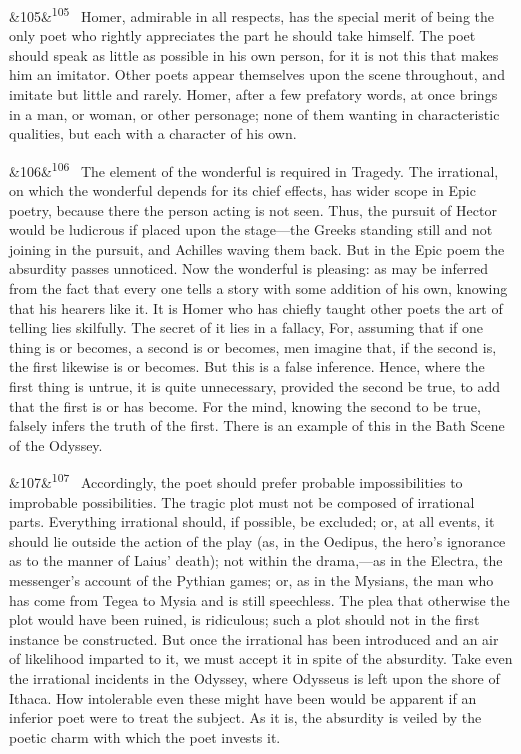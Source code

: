 \documentclass[12pt]{article}
\newcommand{\para}[1][]{\par\noindent\ifx&#1&\else\textsuperscript{\footnotesize #1}~\fi}
\begin{document}
{\para[105] Homer, admirable in all respects, has the special merit of being the only poet who rightly appreciates the part he should take himself. The poet should speak as little as possible in his own person, for it is not this that makes him an imitator. Other poets appear themselves upon the scene throughout, and imitate but little and rarely. Homer, after a few prefatory words, at once brings in a man, or woman, or other personage; none of them wanting in characteristic qualities, but each with a character of his own.

\para[106] The element of the wonderful is required in Tragedy. The irrational, on which the wonderful depends for its chief effects, has wider scope in Epic poetry, because there the person acting is not seen. Thus, the pursuit of Hector would be ludicrous if placed upon the stage---the Greeks standing still and not joining in the pursuit, and Achilles waving them back. But in the Epic poem the absurdity passes unnoticed. Now the wonderful is pleasing: as may be inferred from the fact that every one tells a story with some addition of his own, knowing that his hearers like it. It is Homer who has chiefly taught other poets the art of telling lies skilfully. The secret of it lies in a fallacy, For, assuming that if one thing is or becomes, a second is or becomes, men imagine that, if the second is, the first likewise is or becomes. But this is a false inference. Hence, where the first thing is untrue, it is quite unnecessary, provided the second be true, to add that the first is or has become. For the mind, knowing the second to be true, falsely infers the truth of the first. There is an example of this in the Bath Scene of the Odyssey.

\para[107] Accordingly, the poet should prefer probable impossibilities to improbable possibilities. The tragic plot must not be composed of irrational parts. Everything irrational should, if possible, be excluded; or, at all events, it should lie outside the action of the play (as, in the Oedipus, the hero's ignorance as to the manner of Laius' death); not within the drama,---as in the Electra, the messenger's account of the Pythian games; or, as in the Mysians, the man who has come from Tegea to Mysia and is still speechless. The plea that otherwise the plot would have been ruined, is ridiculous; such a plot should not in the first instance be constructed. But once the irrational has been introduced and an air of likelihood imparted to it, we must accept it in spite of the absurdity. Take even the irrational incidents in the Odyssey, where Odysseus is left upon the shore of Ithaca. How intolerable even these might have been would be apparent if an inferior poet were to treat the subject. As it is, the absurdity is veiled by the poetic charm with which the poet invests it.

}
\end{document}
